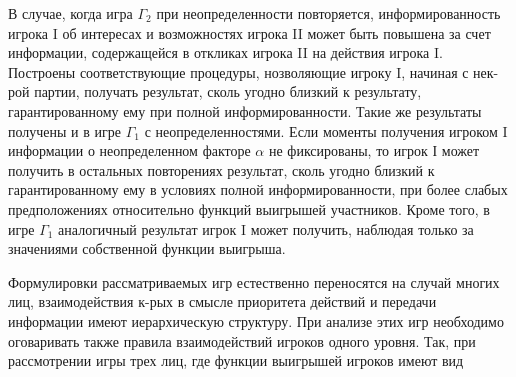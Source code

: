 \documentclass[10pt]{article}
\begin{document}
В случае, когда игра $\Gamma_{2}$ при неопределенности повторяется, информированность игрока I об интересах и возможностях игрока II может быть повышена за счет информации, содержащейся в откликах игрока II на действия игрока I. Построены соответствующие процедуры, нозволяющие игроку I, начиная с нек-рой партии, получать результат, сколь угодно близкий к результату, гарантированному ему при полной информированности. Такие же результаты получены и в игре $\Gamma_{1}$ с неопределенностями. Если моменты получения игроком I информации о неопределенном факторе $\alpha$ не фиксированы, то игрок І может получить в остальных повторениях результат, сколь угодно близкий к гарантированному ему в условиях полной информированности, при более слабых предположениях относительно функций выигрышей участников. Кроме того, в игре $\Gamma_{1}$ аналогичный результат игрок I может получить, наблюдая только за значениями собственной функции выигрыша.



Формулировки рассматриваемых игр естественно переносятся на случай многих лиц, взаимодействия к-рых в смысле приоритета действий и передачи информации имеют иерархическую структуру. При анализе этих игр необходимо оговаривать также правила взаимодействий игроков одного уровня. Так, при рассмотрении игры трех лиц, где функции выигрышей игроков имеют вид
\end{document}
